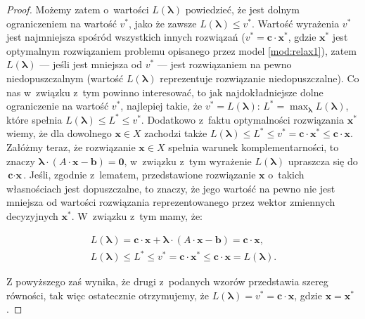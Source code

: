 \begin{proof}
	Możemy zatem o~wartości $L \left( \boldsymbol{\lambda} \right)$ powiedzieć, że jest dolnym ograniczeniem na wartość $v^{\ast}$, jako że zawsze $L \left( \boldsymbol{\lambda} \right) \leqslant v^{\ast}$.
	Wartość wyrażenia $v^{\ast}$ jest najmniejsza spośród wszystkich innych rozwiązań ($v^{\ast} = \textbf{c} \cdot \textbf{x}^{\ast}$, gdzie $\textbf{x}^{\ast}$ jest optymalnym rozwiązaniem problemu opisanego przez model \ref{mod:relax1}), zatem $L \left( \boldsymbol{\lambda} \right)$ --- jeśli jest mniejsza od $v^{\ast}$ --- jest rozwiązaniem na pewno niedopuszczalnym (wartość $L \left( \boldsymbol{\lambda} \right)$ reprezentuje rozwiązanie niedopuszczalne).
	Co nas w~związku z~tym powinno interesować, to jak najdokładniejsze dolne ograniczenie na wartość $v^{\ast}$, najlepiej takie, że $v^{\ast} = L \left( \boldsymbol{\lambda} \right)$: $L^{\ast} = \max_{\boldsymbol{\lambda}} L \left( \boldsymbol{\lambda} \right)$, które spełnia $L \left( \boldsymbol{\lambda} \right) \leqslant L^{\ast} \leqslant v^{\ast}$.
	Dodatkowo z~faktu optymalności rozwiązania $\textbf{x}^{\ast}$ wiemy, że dla dowolnego $\textbf{x} \in X$ zachodzi także $L \left( \boldsymbol{\lambda} \right) \leqslant L^{\ast} \leqslant v^{\ast} = \textbf{c} \cdot \textbf{x}^{\ast} \leqslant \textbf{c} \cdot \textbf{x}$.
	Załóżmy teraz, że rozwiązanie $\textbf{x} \in X$ spełnia warunek komplementarności, to znaczy $\boldsymbol{\lambda} \cdot \left( A \cdot \textbf{x} - \textbf{b} \right) = \textbf{0}$, w~związku z~tym wyrażenie $L \left( \boldsymbol{\lambda} \right)$ upraszcza się do $\textbf{c} \cdot \textbf{x}$.
	Jeśli, zgodnie z~lematem, przedstawione rozwiązanie $\textbf{x}$ o~takich własnościach jest dopuszczalne, to znaczy, że jego wartość na pewno nie jest mniejsza od wartości rozwiązania reprezentowanego przez wektor zmiennych decyzyjnych $\textbf{x}^{\ast}$. W~związku z~tym mamy, że:
	
	\begin{gather}
		L \left( \boldsymbol{\lambda} \right) = \textbf{c} \cdot \textbf{x} + \boldsymbol{\lambda} \cdot \left( A \cdot \textbf{x} - \textbf{b} \right) = \textbf{c} \cdot \textbf{x}\text{,}\\
		L \left( \boldsymbol{\lambda} \right) \leqslant L^{\ast} \leqslant v^{\ast} = \textbf{c} \cdot \textbf{x}^{\ast} \leqslant \textbf{c} \cdot \textbf{x} = L \left( \boldsymbol{\lambda} \right)\text{.}
	\end{gather}
	
	Z powyższego zaś wynika, że drugi z~podanych wzorów przedstawia szereg równości, tak więc ostatecznie otrzymujemy, że $L \left( \boldsymbol{\lambda} \right) = v^{\ast} = \textbf{c} \cdot \textbf{x}$, gdzie $\textbf{x} = \textbf{x}^{\ast}$.
\end{proof}


